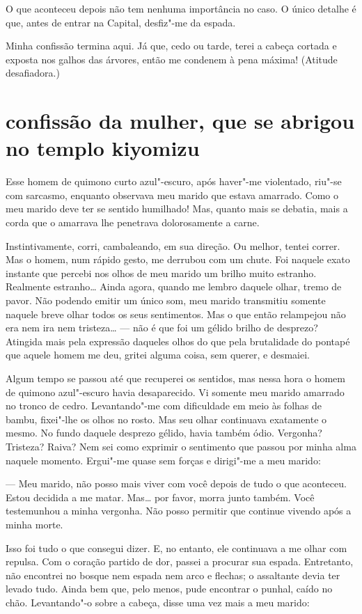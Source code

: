 O que aconteceu depois não tem nenhuma importância no caso. O único
detalhe é que, antes de entrar na Capital, desfiz"-me da espada.

Minha confissão termina aqui. Já que, cedo ou tarde, terei a cabeça
cortada e exposta nos galhos das árvores, então me condenem à pena
máxima! (Atitude desafiadora.)

\section*{confissão da mulher, que se abrigou no templo kiyomizu}

Esse homem de quimono curto azul"-escuro, após haver"-me violentado,
riu"-se com sarcasmo, enquanto observava meu marido que estava amarrado.
Como o meu marido deve ter se sentido humilhado! Mas, quanto mais se
debatia, mais a corda que o amarrava lhe penetrava dolorosamente a
carne.

Instintivamente, corri, cambaleando, em sua direção. Ou melhor, tentei
correr. Mas o homem, num rápido gesto, me derrubou com um chute. Foi
naquele exato instante que percebi nos olhos de meu marido um brilho
muito estranho. Realmente estranho\ldots{} Ainda agora, quando me lembro
daquele olhar, tremo de pavor. Não podendo emitir um único som, meu
marido transmitiu somente naquele breve olhar todos os seus
sentimentos. Mas o que então relampejou não era nem ira nem tristeza\ldots{} 
--- não é que foi um gélido brilho de desprezo? Atingida mais pela
expressão daqueles olhos do que pela brutalidade do pontapé que aquele
homem me deu, gritei alguma coisa, sem querer, e desmaiei.

Algum tempo se passou até que recuperei os sentidos, mas nessa hora o
homem de quimono azul"-escuro havia desaparecido. Vi somente meu marido
amarrado no tronco de cedro. Levantando"-me com dificuldade em meio às
folhas de bambu, fixei"-lhe os olhos no rosto. Mas seu olhar continuava
exatamente o mesmo. No fundo daquele desprezo gélido, havia também
ódio. Vergonha? Tristeza? Raiva? Nem sei como exprimir o sentimento que
passou por minha alma naquele momento. Ergui"-me quase sem forças e
dirigi"-me a meu marido:

--- Meu marido, não posso mais viver com você depois de tudo o que
aconteceu. Estou decidida a me matar. Mas\ldots{} por favor, morra junto
também. Você testemunhou a minha vergonha. Não posso permitir que
continue vivendo após a minha morte.					%

Isso foi tudo o que consegui dizer. E, no entanto, ele continuava a me
olhar com repulsa. Com o coração partido de dor, passei a procurar sua
espada. Entretanto, não encontrei no bosque nem espada nem arco e
flechas; o assaltante devia ter levado tudo. Ainda bem que, pelo menos,
pude encontrar o punhal, caído no chão. Levantando"-o sobre a cabeça,
disse uma vez mais a meu marido:

